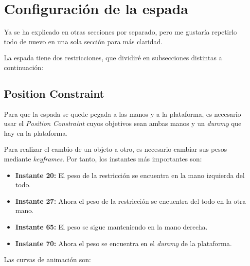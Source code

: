 \section{Configuración de la espada}

Ya se ha explicado en otras secciones por separado, pero me gustaría repetirlo todo de nuevo en una sola sección para más claridad.

\bigskip

La espada tiene dos restricciones, que dividiré en subsecciones distintas a continuación:

\subsection{Position Constraint}

Para que la espada se quede pegada a las manos y a la plataforma, es necesario usar el \textit{Position Constraint} cuyos objetivos sean ambas manos y un \textit{dummy} que hay en la plataforma.

\bigskip

Para realizar el cambio de un objeto a otro, es necesario cambiar sus pesos mediante \textit{keyframes}. Por tanto, los instantes más importantes son: 

\begin{itemize}
    \item \textbf{Instante 20: }El peso de la restricción se encuentra en la mano izquierda del todo.
    \item \textbf{Instante 27: }Ahora el peso de la restricción se encuentra del todo en la otra mano.
    \item \textbf{Instante 65: }El peso se sigue manteniendo en la mano derecha.
    \item \textbf{Instante 70: }Ahora el peso se encuentra en el \textit{dummy} de la plataforma.
\end{itemize}

\bigskip

Las curvas de animación son:

